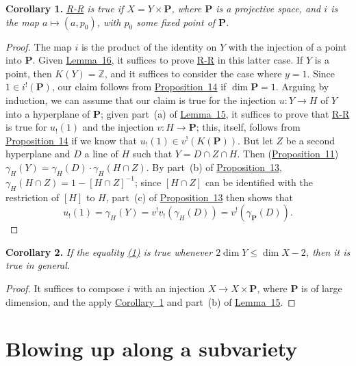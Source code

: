 \documentclass{article}
\newenvironment{itenv}[1]
  {\phantomsection\par\medskip\noindent\textbf{#1.}\itshape}
  {\par\medskip}
\newcommand{\PP}{\mathbf{P}}
\renewcommand{\leq}{\leqslant}
\begin{document}
\begin{itenv}{Corollary 1}
\label{corollary1}
  \hyperref[theoremriemannroch]{R-R} is true if $X=Y\times\PP$, where $\PP$ is a projective space, and $i$ is the map $a\mapsto(a,p_0)$, with $p_0$ some fixed point of $\PP$.
\end{itenv}

\begin{proof}
  The map $i$ is the product of the identity on $Y$ with the injection of a point into $\PP$.
  Given \hyperref[lemma16]{Lemma~16}, it suffices to prove \hyperref[theoremriemannroch]{R-R} in this latter case.
  If $Y$ is a point, then $K(Y)=\mathbb{Z}$, and it suffices to consider the case where $y=1$.
  Since $1\in i^!(\PP)$, our claim follows from \hyperref[proposition14]{Proposition~14} if $\dim\PP=1$.
  Arguing by induction, we can assume that our claim is true for the injection $u\colon Y\to H$ of $Y$ into a hyperplane of $\PP$;
  given part~(a) of \hyperref[lemma15]{Lemma~15}, it suffices to prove that \hyperref[theoremriemannroch]{R-R} is true for $u_!(1)$ and the injection $v\colon H\to \PP$;
  this, itself, follows from \hyperref[proposition14]{Proposition~14} if we know that $u_!(1)\in v^!(K(\PP))$.
  But let $Z$ be a second hyperplane and $D$ a line of $H$ such that $Y=D\cap Z\cap H$.
  Then (\hyperref[proposition11]{Proposition~11}) $\gamma_H(Y) = \gamma_H(D)\cdot\gamma_H(H\cap Z)$.
  By part~(b) of \hyperref[proposition13]{Proposition~13}, $\gamma_H(H\cap Z)=1-[H\cap Z]^{-1}$;
  since $[H\cap Z]$ can be identified with the restriction of $[H]$ to $H$, part~(c) of \hyperref[proposition13]{Proposition~13} then shows that
  \[
    u_!(1) = \gamma_H(Y) = v^!v_!(\gamma_H(D)) = v^!(\gamma_{\PP}(D)).
  \]
\end{proof}

\begin{itenv}{Corollary 2}
\label{corollary2}
  If the equality \hyperref[section11equation1]{(1)} is true whenever $2\dim Y\leq\dim X-2$, then it is true in general.
\end{itenv}

\begin{proof}
  It suffices to compose $i$ with an injection $X\to X\times\PP$, where $\PP$ is of large dimension, and the apply \hyperref[corollary1]{Corollary~1} and part~(b) of \hyperref[lemma15]{Lemma~15}.
\end{proof}


\section{Blowing up along a subvariety}
\label{section12}
\end{document}
